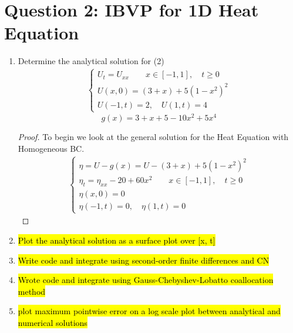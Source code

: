 \documentclass{article}
\begin{document}
\section*{Question 2: IBVP for 1D Heat Equation}

\begin{enumerate}[label=\alph*)]

    \item Determine the analytical solution for (2)
    \begin{align}
        \begin{cases}
            U_t = U_{xx}\quad \quad x \in [-1, 1],
            \quad t \ge 0\\
            U(x,0) = (3+x) + 5(1 - x^2)^2\\
            U(-1,t) = 2, \quad U(1, t) = 4
        \end{cases} 
    \end{align}
    \[
        g(x) =  3 + x + 5 - 10x^2 + 5x^4
    \]
    \begin{proof}
        To begin we look at the general solution for the Heat Equation with
        Homogeneous BC.
        \begin{align*}
            \begin{cases}
                \eta = U - g(x) = U - (3+x) + 5(1 - x^2)^2\\
                \eta_t = \eta_{xx} - 20 + 60x^2 \quad \quad x \in [-1, 1],
                \quad t \ge 0\\
                \eta(x,0) = 0\\
                \eta(-1,t) = 0, \quad \eta(1, t) = 0
            \end{cases}
        \end{align*}
        
    \end{proof}
    \item \hl{Plot the analytical solution as a surface plot over [x, t]}

    \item \hl{Write code and integrate using second-order finite differences and CN}

    \item \hl{Wrote code and integrate using Gauss-Chebyshev-Lobatto coallocation
    method}

    \item \hl{plot maximum pointwise error on a log scale plot between analytical
    and numerical solutions}

\end{enumerate}
\end{document}
